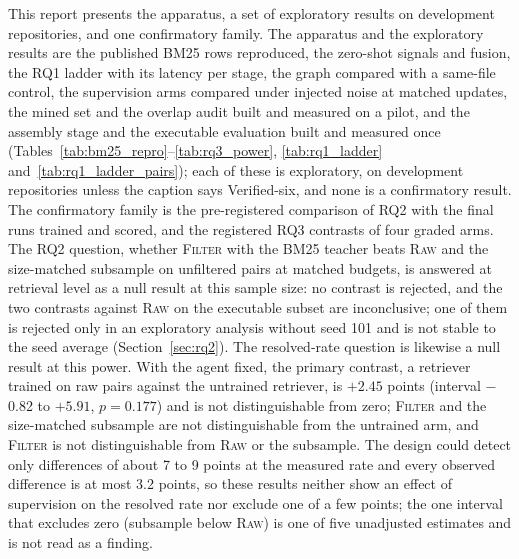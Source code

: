 \documentclass[10pt,twocolumn]{article}
\makeatletter
\renewcommand\section{\@startsection{section}{1}{\z@}{6pt}{3pt}{\normalfont\large\bfseries}}
\makeatother
\begin{document}
\section{Conclusion}

This report presents the apparatus, a set of exploratory results on development repositories, and one confirmatory family. The apparatus and the exploratory results are the published BM25 rows reproduced, the zero-shot signals and fusion, the RQ1 ladder with its latency per stage, the graph compared with a same-file control, the
supervision arms compared under injected noise at matched updates, the mined set and the overlap audit
built and measured on a pilot, and the assembly stage and the executable evaluation built and measured once
(Tables~\ref{tab:bm25_repro}--\ref{tab:rq3_power}, \ref{tab:rq1_ladder} and~\ref{tab:rq1_ladder_pairs}); each of these is exploratory, on development repositories unless the caption says Verified-six, and none is a confirmatory result.
The confirmatory family is the pre-registered comparison of RQ2 with the final runs trained and scored, and the registered RQ3 contrasts of four graded arms. The RQ2 question, whether \textsc{Filter} with the BM25 teacher
beats \textsc{Raw} and the size-matched subsample on unfiltered pairs at matched budgets, is answered at retrieval level as a null result at this sample size: no contrast is rejected, and the two contrasts against \textsc{Raw} on the executable subset are inconclusive; one of them is rejected only in an exploratory analysis without seed 101 and is not stable to the seed average (Section~\ref{sec:rq2}). %
The resolved-rate question is likewise a null result at this power. With the agent fixed, the primary contrast, a retriever trained on raw pairs against the untrained retriever, is $+2.45$ points (interval $-$0.82 to $+5.91$, $p=0.177$) and is not distinguishable from zero; \textsc{Filter} and the size-matched subsample are not distinguishable from the untrained arm, and \textsc{Filter} is not distinguishable from \textsc{Raw} or the subsample. %
The design could detect only differences of about 7 to 9 points at the measured rate and every observed difference is at most 3.2 points, so these results neither show an effect of supervision on the resolved rate nor exclude one of a few points; the one interval that excludes zero (subsample below \textsc{Raw}) is one of five unadjusted estimates and is not read as a finding. %
\end{document}
